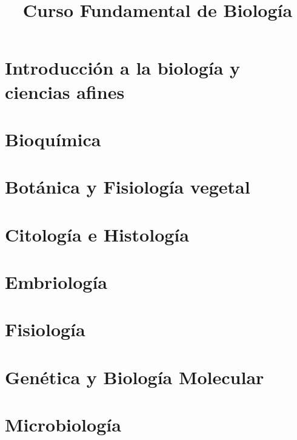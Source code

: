 \documentclass[a4paper, oneside, 10pt]{book}
\title{Curso Fundamental de Biología}
\begin{document}
    
    \clearpage
    \tableofcontents
    \clearpage
    \listoffigures
    \clearpage
    \listoftables
    \clearpage
    \listofEcuacion
    \clearpage
    \listofFormula
    \clearpage
    
    \part{Introducción a la biología y ciencias afines}
    
    \part{Bioquímica}
    
    
    \part{Botánica y Fisiología vegetal}
    \part{Citología e Histología}
     
     
    \part{Embriología}
    \part{Fisiología}
    \part{Genética y Biología Molecular}
    \part{Microbiología}
     
     
     
\end{document}
